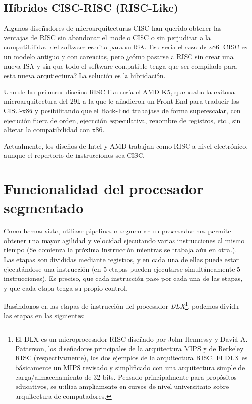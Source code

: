\documentclass[a4paper, 11pt, titlepage]{article}
\begin{document}
    \subsection{Híbridos CISC-RISC (RISC-Like)}

        Algunos diseñadores de microarquitecturas CISC han querido obtener las ventajas de RISC sin abandonar el modelo CISC o sin 
        perjudicar a la compatibilidad del software escrito para su ISA. Eso sería el caso de x86. CISC es un modelo antiguo y con 
        carencias, pero ¿cómo pasarse a RISC sin crear una nueva ISA y sin que todo el software compatible tenga que ser compilado 
        para esta nueva arqutiectura? La solución es la hibridación.

        Uno de los primeros diseños RISC-like sería el AMD K5, que usaba la exitosa microarquitectura del 29k a la que le añadieron 
        un Front-End para traducir las CISC-x86 y posibilitando que el Back-End trabajase de forma superescalar, con ejecución fuera 
        de orden, ejecución especulativa, renombre de registros, etc., sin alterar la compatibilidad con x86.

        Actualmente, los diseños de Intel y AMD trabajan como RISC a nivel electrónico, aunque el repertorio de instrucciones sea 
        CISC.

\section{Funcionalidad del procesador segmentado}

    Como hemos visto, utilizar pipelines o segmentar un procesador nos permite obtener una mayor agilidad y velocidad ejecutando varias 
    instrucciones al mismo tiempo (Se  comienza  la  próxima  instrucción mientras se trabaja aún en otra.). Las etapas son divididas 
    mediante registros, y en cada una de ellas puede estar ejecutándose una 
    instrucción (en 5 etapas pueden ejecutarse simultáneamente 5 instrucciones). Es  preciso, que cada instrucción pase por cada una 
    de las etapas, y que cada etapa tenga su propio control. 

    Basándonos en las etapas de instrucción del procesador \textit{DLX}\footnote{
        El DLX es un microprocesador RISC diseñado por John Hennessy y David A. Patterson, los diseñadores principales de la 
        arquitectura MIPS y de Berkeley RISC (respectivamente), los dos ejemplos de la arquitectura RISC. El DLX es básicamente 
        un MIPS revisado y simplificado con una arquitectura simple de carga/almacenamiento de 32 bits. Pensado principalmente 
        para propósitos educativos, se utiliza ampliamente en cursos de nivel universitario sobre arquitectura de computadores. 
    }, podemos dividir las etapas en las siguientes:
\end{document}
